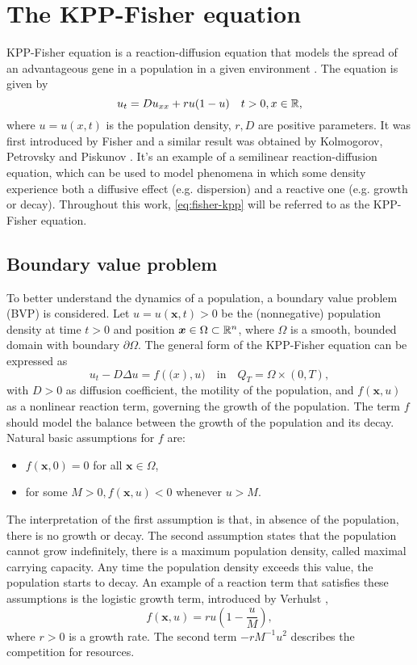 \section{The KPP-Fisher equation}
KPP-Fisher equation is a reaction-diffusion equation that models the spread of an advantageous gene in a population in a given environment \cite{SalsaVerziniPDE}. The equation is given by
\begin{equation}
    u_t = Du_{xx} + ru(1-u) \quad t > 0, x \in \mathbb{R},
    \label{eq:fisher-kpp}
\end{equation}
where $u = u(x, t)$ is the population density, $r, D$ are positive parameters. It was first introduced by Fisher \cite{Fisher1937} and a similar result was obtained by Kolmogorov, Petrovsky and Piskunov \cite{KPP1937}. It's an example of a semilinear reaction-diffusion equation, which can be used to model phenomena in which some density experience both a diffusive effect (e.g. dispersion) and a reactive one (e.g. growth or decay). Throughout this work, \eqref{eq:fisher-kpp} will be referred to as the KPP-Fisher equation.

\subsection{Boundary value problem}
To better understand the dynamics of a population, a boundary value problem (BVP) is considered. Let \(u = u(\bm{x}, t) > 0\) be the (nonnegative) population density at time \(t > 0\) and position \(\bm{x} \in \Omega \subset \mathbb{R}^n\), where \(\Omega\) is a smooth, bounded domain with boundary \(\partial \Omega\). 
The general form of the KPP-Fisher equation can be expressed as 
\begin{equation}
    u_t - D \Delta u = f(\bm(x), u) \quad \text{in} \quad Q_T = \Omega \times (0, T),
    \label{eq:fisher-kpp-general}
\end{equation}
with \(D > 0\) as diffusion coefficient, the motility of the population, and \(f(\bm{x}, u)\) as a nonlinear reaction term, governing the growth of the population. The term \(f\) should model the balance between the growth of the population and its decay. Natural basic assumptions for \(f\) are:
\begin{itemize}
    \item \(f(\bm{x}, 0) = 0\) for all \(\bm{x} \in \Omega\),
    \item for some \(M > 0, f(\bm{x}, u) < 0\) whenever \(u > M\).
\end{itemize}
The interpretation of the first assumption is that, in absence of the population, there is no growth or decay. The second assumption states that the population cannot grow indefinitely, there is a maximum population density, called maximal carrying capacity. Any time the population density exceeds this value, the population starts to decay. An example of a reaction term that satisfies these assumptions is the logistic growth term, introduced by Verhulst \cite{Verhulst1847}, 
\begin{equation}
    f(\bm{x}, u) = ru\left(1 - \frac{u}{M}\right), 
\end{equation}
where \(r > 0\) is a growth rate. The second term \(-rM^{-1}u^2\) describes the competition for resources.

